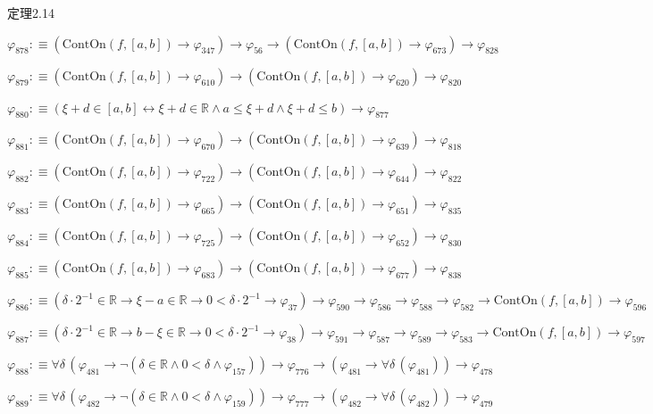 \begin{fullproof}{定理2.14}
\begin{abbrevlist}
\item $\varphi_{878} :\equiv (\mathrm{ContOn}(f,[a,b]) \to \varphi_{347}) \to \varphi_{56} \to (\mathrm{ContOn}(f,[a,b]) \to \varphi_{673}) \to \varphi_{828}$
\item $\varphi_{879} :\equiv (\mathrm{ContOn}(f,[a,b]) \to \varphi_{610}) \to (\mathrm{ContOn}(f,[a,b]) \to \varphi_{620}) \to \varphi_{820}$
\item $\varphi_{880} :\equiv (\xi + d \in [a,b] \leftrightarrow \xi + d \in \mathbb{R} \land a \leq \xi + d \land \xi + d \leq b) \to \varphi_{877}$
\item $\varphi_{881} :\equiv (\mathrm{ContOn}(f,[a,b]) \to \varphi_{670}) \to (\mathrm{ContOn}(f,[a,b]) \to \varphi_{639}) \to \varphi_{818}$
\item $\varphi_{882} :\equiv (\mathrm{ContOn}(f,[a,b]) \to \varphi_{722}) \to (\mathrm{ContOn}(f,[a,b]) \to \varphi_{644}) \to \varphi_{822}$
\item $\varphi_{883} :\equiv (\mathrm{ContOn}(f,[a,b]) \to \varphi_{665}) \to (\mathrm{ContOn}(f,[a,b]) \to \varphi_{651}) \to \varphi_{835}$
\item $\varphi_{884} :\equiv (\mathrm{ContOn}(f,[a,b]) \to \varphi_{725}) \to (\mathrm{ContOn}(f,[a,b]) \to \varphi_{652}) \to \varphi_{830}$
\item $\varphi_{885} :\equiv (\mathrm{ContOn}(f,[a,b]) \to \varphi_{683}) \to (\mathrm{ContOn}(f,[a,b]) \to \varphi_{677}) \to \varphi_{838}$
\item $\varphi_{886} :\equiv (\delta \cdot 2^{-1} \in \mathbb{R} \to \xi - a \in \mathbb{R} \to 0 < \delta \cdot 2^{-1} \to \varphi_{37}) \to \varphi_{590} \to \varphi_{586} \to \varphi_{588} \to \varphi_{582} \to \mathrm{ContOn}(f,[a,b]) \to \varphi_{596}$
\item $\varphi_{887} :\equiv (\delta \cdot 2^{-1} \in \mathbb{R} \to b - \xi \in \mathbb{R} \to 0 < \delta \cdot 2^{-1} \to \varphi_{38}) \to \varphi_{591} \to \varphi_{587} \to \varphi_{589} \to \varphi_{583} \to \mathrm{ContOn}(f,[a,b]) \to \varphi_{597}$
\item $\varphi_{888} :\equiv \forall \delta\,(\varphi_{481} \to \neg (\delta \in \mathbb{R} \land 0 < \delta \land \varphi_{157})) \to \varphi_{776} \to (\varphi_{481} \to \forall \delta\,(\varphi_{481})) \to \varphi_{478}$
\item $\varphi_{889} :\equiv \forall \delta\,(\varphi_{482} \to \neg (\delta \in \mathbb{R} \land 0 < \delta \land \varphi_{159})) \to \varphi_{777} \to (\varphi_{482} \to \forall \delta\,(\varphi_{482})) \to \varphi_{479}$

\end{abbrevlist}
\end{fullproof}
